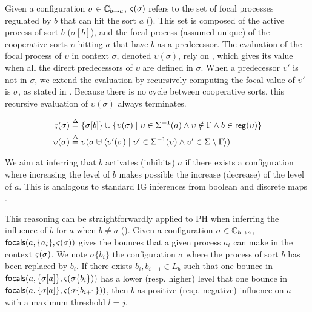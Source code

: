 Given a configuration $\sigma\in\mathbb C_{b\rightarrow a}$, $\varsigma(\sigma)$ refers to the set of focal processes
regulated by $b$ that can hit the sort $a$ ().
This set is composed of the active process of sort $b$ ($\sigma[b]$), and the focal process (assumed
unique) of the cooperative sorts $\upsilon$ hitting $a$ that have $b$ as a predecessor.
The evaluation of the focal process of $\upsilon$ in context $\sigma$, denoted $\upsilon(\sigma)$,
rely on , which gives its value when all the direct predecessors of
$\upsilon$ are defined in $\sigma$.
When a predecessor $\upsilon'$ is not in $\sigma$, we extend the evaluation by recursively computing
the focal value of $\upsilon'$ is $\sigma$, as stated in .
Because there is no cycle between cooperative sorts, this recursive evaluation of $\upsilon(\sigma)$
always terminates.

\begin{align}
\varsigma(\sigma) & \stackrel{\Delta}= \{ \sigma[b] \} \cup \{ \upsilon(\sigma) \mid
\upsilon\in\Sigma^{-1}(a) \wedge  \upsilon \notin\Gamma \wedge b\in \mathsf{reg}({\upsilon}) \}
\label{eq:ctx-sigma}
\\
\upsilon(\sigma) & \stackrel{\Delta}=
\upsilon(\sigma \uplus \langle \upsilon'(\sigma) \mid 
	\upsilon'\in\Sigma^{-1}(\upsilon) \wedge
	\upsilon'\in\Sigma\setminus\Gamma  \rangle)
\label{eq:cooperative-eval}
\end{align}

We aim at inferring that $b$ activates (inhibits) $a$ if there exists a configuration where increasing
the level of $b$ makes possible the increase (decrease) of the level of $a$.
This is analogous to standard IG inferences from boolean and discrete maps 
\cite{RiCo07}.

This reasoning can be straightforwardly applied to PH when inferring the influence of $b$ for $a$ when
$b\neq a$ ().
Given a configuration $\sigma\in\mathbb C_{b\rightarrow a}$, 
$\mathsf{focals}(a,\{a_i\},\varsigma(\sigma))$ gives the bounces that a given process $a_i$ can make in the
context $\varsigma(\sigma)$.
We note $\sigma\{b_i\}$ the configuration $\sigma$ where the process of sort $b$ has been replaced
by $b_i$.
If there exists $b_i,b_{i+1}\in L_b$ such that one bounce in 
$\mathsf{focals}(a, \{\sigma[a]\}, \varsigma(\sigma\{b_i\}))$
has a lower (resp. higher) level that one bounce in
$\mathsf{focals}(a, \{\sigma[a]\}, \varsigma(\sigma\{b_{i+1}\}))$, then
$b$ as positive (resp. negative) influence on $a$ with a maximum threshold $l=j$.

